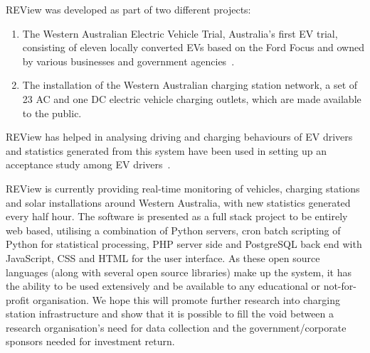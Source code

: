 REView was developed as part of two different projects:
\begin{enumerate}
	\item The Western Australian Electric Vehicle Trial, Australia’s first EV trial, consisting of eleven locally converted EVs based on the Ford Focus and owned by various businesses and government agencies~\cite{mader_western_2013}.
	\item The installation of the Western Australian charging station network, a set of 23 AC and one DC electric vehicle charging outlets, which are made available to the public.
\end{enumerate}
REView has helped in analysing driving and charging behaviours of EV drivers~\cite{speidel_driving_2014, jabeen_electric_2013, speidel_analysis_2012} and statistics generated from this system have been used in setting up an acceptance study among EV drivers~\cite{jabeen_acceptability_2012}.

REView is currently providing real-time monitoring of vehicles, charging stations and solar installations around Western Australia, with new statistics generated every half hour. The software is presented as a full stack project to be entirely web based, utilising a combination of Python servers, cron batch scripting of Python for statistical processing, PHP server side and PostgreSQL back end with JavaScript, CSS and HTML for the user interface. As these open source languages (along with several open source libraries) make up the system, it has the ability to be used extensively and be available to any educational or not-for-profit organisation. We hope this will promote further research into charging station infrastructure and show that it is possible to fill the void between a research organisation’s need for data collection and the government/corporate sponsors needed for investment return.


